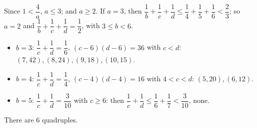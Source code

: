Since $1<\dfrac{4}{a}$, $a\le3$; and $a\ge2$. If $a=3$, then $\dfrac{1}{b}+\dfrac{1}{c}+\dfrac{1}{d}\le\dfrac{1}{4}+\dfrac{1}{5}+\dfrac{1}{6}<\dfrac{2}{3}$; so $a=2$ and $\dfrac{1}{b}+\dfrac{1}{c}+\dfrac{1}{d}=\dfrac{1}{2}$, with $3\le b<6$.
\begin{itemize}
\item $b=3$: $\dfrac{1}{c}+\dfrac{1}{d}=\dfrac{1}{6}$, $(c-6)(d-6)=36$ with $c<d$: $(7,42),(8,24),(9,18),(10,15)$.
\item $b=4$: $\dfrac{1}{c}+\dfrac{1}{d}=\dfrac{1}{4}$, $(c-4)(d-4)=16$ with $4<c<d$: $(5,20),(6,12)$.
\item $b=5$: $\dfrac{1}{c}+\dfrac{1}{d}=\dfrac{3}{10}$ with $c\ge6$: then $\dfrac{1}{c}+\dfrac{1}{d}\le\dfrac{1}{6}+\dfrac{1}{7}<\dfrac{3}{10}$, none.
\end{itemize}
There are $\boxed{6}$ quadruples.
